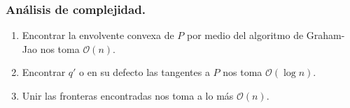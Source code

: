 \begin{frame}
  \frametitle{Análisis de complejidad.}
  \begin{enumerate}
  \item Encontrar la envolvente convexa de $P$ por medio del algoritmo de Graham-Jao nos toma $\mathcal{O}(n)$.
  \item Encontrar $q'$ o en su defecto las tangentes a $P$ nos toma $\mathcal{O}(\log n)$.
  \item Unir las fronteras encontradas nos toma a lo más $\mathcal{O}(n)$.
  \end{enumerate}
\end{frame}
